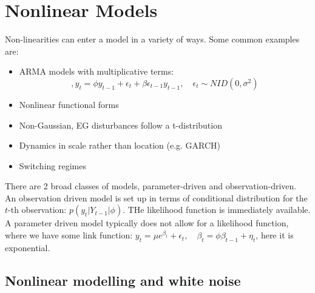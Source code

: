 \documentclass[DIV=14,titlepage=false]{scrreprt}
\begin{document}
\vspace{-10pt}
\setcounter{chapter}{6}


\chapter{Nonlinear Models}
Non-linearities can enter a model in a variety of ways. Some common examples are:
\begin{itemize}
    \item ARMA models with multiplicative terms:
     \[
        ,y_t = \phi y_{t-1} +\epsilon_t + \beta \epsilon_{t-1} y_{t-1}, \quad \epsilon_t \sim NID(0,\sigma^2)
    \]
    \item Nonlinear functional forms
    \item Non-Gaussian, EG disturbances follow a t-distribution
    \item Dynamics in scale rather than location (e.g. GARCH)
    \item Switching regimes
\end{itemize}
There are 2 broad classes of models, parameter-driven and observation-driven.\\
An observation driven model is set up in terms of conditional distribution for the $t$-th observation: $p(y_t|Y_{t-1}|\phi)$. THe likelihood function is immediately available.\\
A parameter driven model typically does not allow for a likelihood function, where we have some link function: $ y_t = \mu e^{\beta_t} + \epsilon_t, \quad \beta_t = \phi \beta_{t-1} + \eta_t$, here it is exponential.
\section{Nonlinear modelling and white noise}
\end{document}
